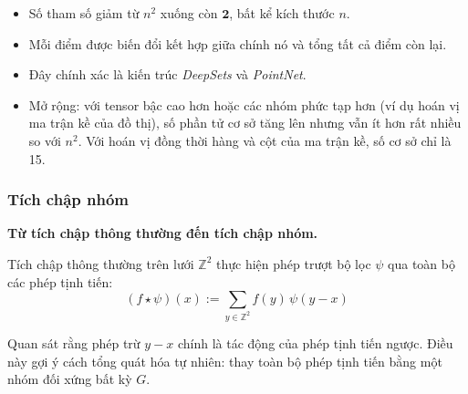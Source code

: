 \begin{itemize}
    \item Số tham số giảm từ $n^2$ xuống còn $\mathbf{2}$, bất kể kích thước $n$.
    \item Mỗi điểm được biến đổi kết hợp giữa chính nó và tổng tất cả điểm còn lại.
    \item Đây chính xác là kiến trúc \textit{DeepSets} và \textit{PointNet}.
    \item Mở rộng: với tensor bậc cao hơn hoặc các nhóm phức tạp hơn (ví dụ hoán vị ma trận kề của đồ thị), số phần tử cơ sở tăng lên nhưng vẫn ít hơn rất nhiều so với $n^2$. Với hoán vị đồng thời hàng và cột của ma trận kề, số cơ sở chỉ là 15.
\end{itemize}

\subsubsection{Tích chập nhóm}
\label{subsubsec:group-convolution}

\textbf{Từ tích chập thông thường đến tích chập nhóm.}

Tích chập thông thường trên lưới $\mathbb{Z}^2$ thực hiện phép trượt bộ lọc $\psi$ qua toàn bộ các phép tịnh tiến:
\begin{equation}
    (f \star \psi)(x) := \sum_{y \in \mathbb{Z}^2} f(y)\, \psi(y - x)
    \label{eq:regular-conv}
\end{equation}

Quan sát rằng phép trừ $y - x$ chính là tác động của phép tịnh tiến ngược. Điều này gợi ý cách tổng quát hóa tự nhiên: thay toàn bộ phép tịnh tiến bằng một nhóm đối xứng bất kỳ $G$.


